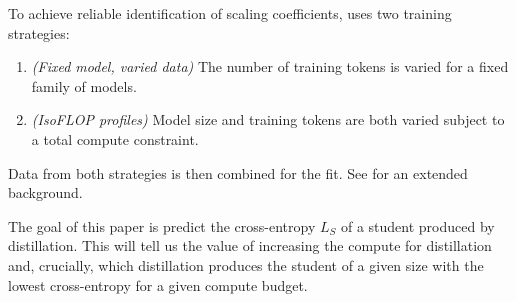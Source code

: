 To achieve reliable identification of scaling coefficients,
\citet{DBLP:journals/corr/abs-2203-15556} uses two training strategies:
\begin{enumerate}
	\item \emph{(Fixed model, varied data)} The number of training tokens is varied for a fixed family of models.
	\item \emph{(IsoFLOP profiles)} Model size and training tokens are both varied subject to a total compute constraint.
\end{enumerate}
Data from both strategies is then combined for the fit.
See 
for an extended background.

The goal of this paper is predict the cross-entropy $L_S$ of a student produced by distillation.
This will tell us the value of increasing the compute for distillation and,
crucially,
which distillation produces the student of a given size with the lowest cross-entropy for a given compute budget.
